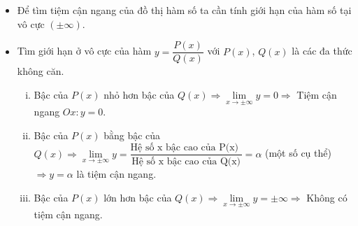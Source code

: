 \begin{nx} \quad
    \begin{itemize}
        \item Để tìm tiệm cận ngang của đồ thị hàm số ta cần tính giới hạn của hàm số tại vô cực $(\pm \infty)$.
        \item Tìm giới hạn ở vô cực của hàm $y=\dfrac{P(x)}{Q(x)}$ với $P(x)$, $Q(x)$ là các đa thức không căn.
        \begin{enumerate}[i)]
            \item Bậc của $P(x)$ nhỏ hơn bậc của $Q(x) \Rightarrow \lim\limits_{x\to \pm\infty} y =0 \Rightarrow$ Tiệm cận ngang $Ox \colon y=0$.
            \item Bậc của $P(x)$ bằng bậc của $Q(x) \Rightarrow \lim\limits_{x\to \pm\infty} y = \dfrac{\text{Hệ số x bậc cao của P(x) }}{\text{Hệ số x bậc cao của Q(x)}} = \alpha$ (một số cụ thể) $\Rightarrow y= \alpha$ là tiệm cận ngang.
            \item Bậc của $P(x)$ lớn hơn bậc của $Q(x) \Rightarrow \lim\limits_{x\to \pm\infty} y = \pm \infty \Rightarrow$ Không có tiệm cận ngang.
        \end{enumerate}
    \end{itemize}
\end{nx}
